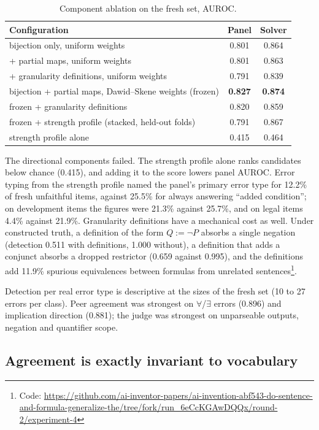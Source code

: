 \documentclass[11pt,letterpaper]{article}
\newcommand{\fe}{$\forall$/$\exists$}
\begin{document}
\begin{table}[!htbp]
  \centering
  \small
  \caption{Component ablation on the fresh set, AUROC.}
  \label{tab:ablation}
  \begin{tabular}{lcc}
    \toprule
    Configuration & Panel & Solver \\
    \midrule
    bijection only, uniform weights & 0.801 & 0.864 \\
    \quad + partial maps, uniform weights & 0.801 & 0.863 \\
    \quad + granularity definitions, uniform weights & 0.791 & 0.839 \\
    bijection + partial maps, Dawid--Skene weights (frozen) & \textbf{0.827} & \textbf{0.874} \\
    frozen + granularity definitions & 0.820 & 0.859 \\
    frozen + strength profile (stacked, held-out folds) & 0.791 & 0.867 \\
    strength profile alone & 0.415 & 0.464 \\
    \bottomrule
  \end{tabular}
\end{table}

The directional components failed. The strength profile alone ranks candidates below chance (0.415), and adding it to the score lowers panel AUROC. Error typing from the strength profile named the panel's primary error type for 12.2\% of fresh unfaithful items, against 25.5\% for always answering ``added condition''; on development items the figures were 21.3\% against 25.7\%, and on legal items 4.4\% against 21.9\%. Granularity definitions have a mechanical cost as well. Under constructed truth, a definition of the form $Q := \neg P$ absorbs a single negation (detection 0.511 with definitions, 1.000 without), a definition that adds a conjunct absorbs a dropped restrictor (0.659 against 0.995), and the definitions add 11.9\% spurious equivalences between formulas from unrelated sentences\footnote{Code: \url{https://github.com/ai-inventor-papers/ai-invention-abf543-do-sentence-and-formula-generalize-the/tree/fork/run_6eCcKGAwDQQx/round-2/experiment-4}}.

Detection per real error type is descriptive at the sizes of the fresh set (10 to 27 errors per class). Peer agreement was strongest on \fe{} errors (0.896) and implication direction (0.881); the judge was strongest on unparseable outputs, negation and quantifier scope.

\subsection{Agreement is exactly invariant to vocabulary}
\label{sec:invariance}
\end{document}
